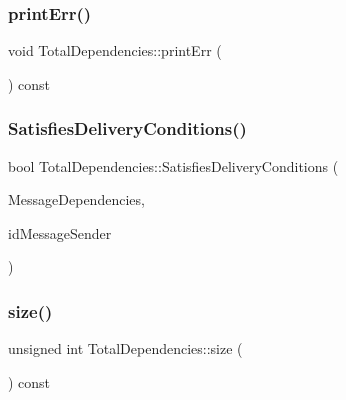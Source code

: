 \mbox{\label{class_total_dependencies_a514df10fe452f2000ceec5e279eae802}} 
\subsubsection{\texorpdfstring{print\+Err()}{printErr()}}
{\footnotesize\ttfamily void Total\+Dependencies\+::print\+Err (\begin{DoxyParamCaption}{ }\end{DoxyParamCaption}) const}

\mbox{\label{class_total_dependencies_a6d050146cb0298091a4614610997d772}} 
\subsubsection{\texorpdfstring{Satisfies\+Delivery\+Conditions()}{SatisfiesDeliveryConditions()}}
{\footnotesize\ttfamily bool Total\+Dependencies\+::\+Satisfies\+Delivery\+Conditions (\begin{DoxyParamCaption}\item[{const \hyperlink{class_total_dependencies}{Total\+Dependencies} \&}]{Message\+Dependencies,  }\item[{unsigned int}]{id\+Message\+Sender }\end{DoxyParamCaption})}

\mbox{\label{class_total_dependencies_a00ea27540cc51d5770d6013a21a41de2}} 
\subsubsection{\texorpdfstring{size()}{size()}}
{\footnotesize\ttfamily unsigned int Total\+Dependencies\+::size (\begin{DoxyParamCaption}{ }\end{DoxyParamCaption}) const}



